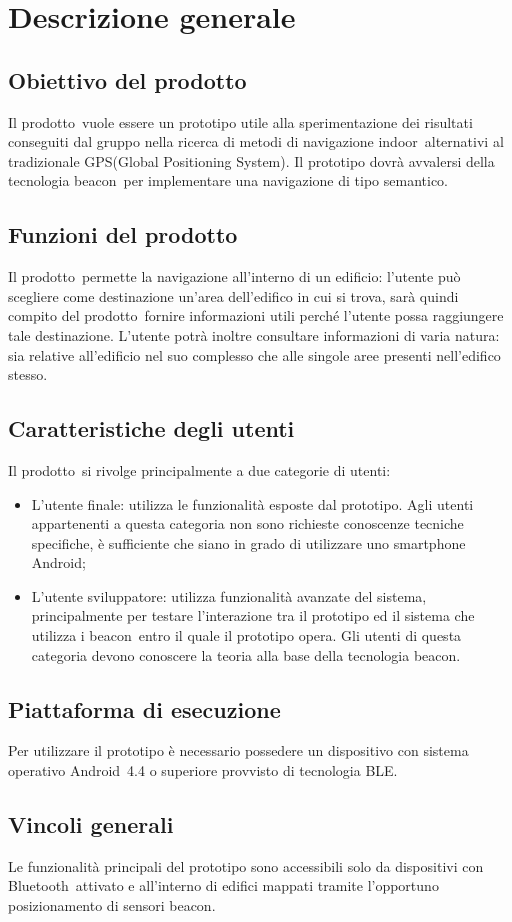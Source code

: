 \documentclass[../AnalisiDeiRequisiti.tex]{subfiles}
\begin{document}
\section{Descrizione generale}
	\subsection{Obiettivo del prodotto}
	Il prodotto\g\ vuole essere un prototipo utile alla sperimentazione dei risultati conseguiti dal gruppo nella ricerca di metodi di navigazione indoor\g\ alternativi al tradizionale GPS(Global Positioning System).
Il prototipo dovrà avvalersi della tecnologia beacon\g\ per implementare una navigazione di tipo semantico.

	\subsection{Funzioni del prodotto}
	Il prodotto\g\ permette la navigazione all'interno di un edificio: l'utente può scegliere come destinazione un'area dell'edifico in cui si trova, sarà quindi compito del prodotto\g\ 
fornire informazioni utili perché l'utente possa raggiungere tale destinazione.
L'utente potrà inoltre consultare informazioni di varia natura: sia relative all'edificio nel suo complesso che alle singole aree presenti nell'edifico stesso.
		
	\subsection{Caratteristiche degli utenti} 
	Il prodotto\g\ si rivolge principalmente a due categorie di utenti:
	\begin{itemize}
		\item L'utente finale: utilizza le funzionalità esposte dal prototipo. Agli utenti appartenenti a questa categoria non sono richieste conoscenze tecniche specifiche, è sufficiente che siano in grado di utilizzare uno smartphone Android\g;
		\item L'utente sviluppatore: utilizza funzionalità avanzate del sistema, principalmente per testare l'interazione tra il prototipo ed il sistema che utilizza i beacon\g\ entro il quale il prototipo opera. Gli utenti di questa categoria devono conoscere la teoria alla base della tecnologia beacon\g.
	\end{itemize}
	
	\subsection{Piattaforma di esecuzione}
	Per utilizzare il prototipo è necessario possedere un dispositivo con sistema operativo Android\g\ 4.4 o superiore provvisto di tecnologia BLE\g.
	
	\subsection{Vincoli generali}
	Le funzionalità principali del prototipo sono accessibili solo da dispositivi con Bluetooth\g\ attivato e all'interno di edifici mappati tramite l'opportuno posizionamento di sensori beacon\g.
\end{document}

